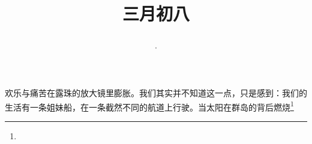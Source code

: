 \title{\date[d=16,m=4,y=2024][year:cn-y,年,month:cn,day:cn,日,·,weekday]·三月初八 }
欢乐与痛苦在露珠的放大镜里膨胀。我们其实并不知道这一点，只是感到：我们的生活有一条姐妹船，在一条截然不同的航道上行驶。当太阳在群岛的背后燃烧\footnote{ }

